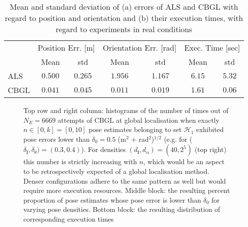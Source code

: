\begin{table}[H]\footnotesize
\begin{tabular}{@{}lcccccc@{}}
     & \multicolumn{2}{l}{Position Err. {[}m{]}} & \multicolumn{2}{l}{Orientation Err. {[}rad{]}} & \multicolumn{2}{l}{Exec. Time {[}sec{]}} \\
     & Mean              & std              & Mean                & std                 & Mean                & std                \\ \midrule
ALS  & $0.500 $          & $0.265 $         & $1.956 $            & $1.167 $            & $6.15 $             & $5.32 $            \\
CBGL & $0.041 $          & $0.045 $         & $0.011 $            & $0.019 $            & $1.61 $             & $0.06 $            \\ \bottomrule
\end{tabular}
  \caption{\small Mean and standard deviation of (a) errors of ALS and CBGL with
                regard to position and orientation and (b) their execution times,
                with regard to experiments in real conditions}
\label{tbl:a}
\end{table}




\begin{figure}
  \vspace{-0.4cm}
  
  \vspace{-0.4cm}
  \caption{\small Top row and right column: histograms of the number of times
           out of $N_E = 6669$ attempts of CBGL at global localisation
           when exactly $n \in [0,k] = [0,10]$ pose estimates belonging to set
           $\mathcal{H}_1$ exhibited pose errors lower than
           $\delta_0 = 0.5$ (m$^2$ + rad$^2$)$^{1/2}$ (e.g. for
           ($\delta_{\bm{l}}, \delta_{\theta}) = (0.3,0.4)$). For densities
           $(d_{\bm{l}},d_{\alpha}) = (40, 2^5)$ (top right) this number is
           strictly increasing with $n$, which would be an aspect to be
           retrospectively expected of a global localisation method. Denser
           configurations adhere to the same pattern as well but would require
           more execution resources. Middle block: the resulting percent
           proportion of pose estimates whose pose error is lower than
           $\delta_0$ for varying pose densities. Bottom block: the resulting
           distribution of corresponding execution times
           }
  \label{fig:a:determine_40_32}
\end{figure}


